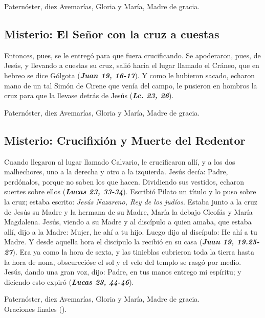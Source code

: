 \documentclass[./main.tex]{subfiles}
\newcounter{sorrowful-counter}
\begin{document}
\begin{center}
      Paternóster, diez Avemarías, Gloria y María, Madre de gracia.
\end{center}

\subsection*{ Misterio: El Señor con la cruz a cuestas}
Entonces, pues, se le entregó para que fuera crucificando. Se apoderaron, pues, de Jesús, y llevando a cuestas su cruz, salió hacia el lugar llamado el Cráneo, 
que en hebreo se dice Gólgota (\textbf{\emph{Juan 19, 16-17}}). Y como le hubieron sacado, echaron mano de un tal Simón de Cirene que venía del campo, 
le pusieron en hombros la cruz para que la llevase detrás de Jesús (\textbf{\emph{Lc. 23, 26}}).

\begin{center}
      Paternóster, diez Avemarías, Gloria y María, Madre de gracia.
\end{center}

\subsection*{ Misterio: Crucifixión y Muerte del Redentor}
Cuando llegaron al lugar llamado Calvario, le crucificaron allí, y a los dos malhechores, uno a la derecha y otro a la izquierda. Jesús decía: Padre, perdónalos, porque no saben los que hacen. 
Dividiendo sus vestidos, echaron suertes sobre ellos (\textbf{\emph{Lucas 23, 33-34}}). Escribió Pilato un título y lo puso sobre la cruz; estaba escrito: \emph{Jesús Nazareno, Rey de los judíos}. 
Estaba junto a la cruz de Jesús su Madre y la hermana de su Madre, María la debajo Cleofás y María Magdalena. Jesús, viendo a su Madre y al discípulo a quien amaba, que estaba allí, 
dijo a la Madre: Mujer, he ahí a tu hijo. Luego dijo al discípulo: He ahí a tu Madre. Y desde aquella hora el discípulo la recibió en su casa (\textbf{\emph{Juan 19, 19.25-27}}). Era ya como
la hora de sexta, y las tinieblas cubrieron toda la tierra hasta la hora de nona, obscurecióse el sol y el velo del templo se rasgó por medio. Jesús, dando una gran voz, dijo: Padre, en tus 
manos entrego mi espíritu; y diciendo esto expiró (\textbf{\emph{Lucas 23, 44-46}}).

\begin{center}
      Paternóster, diez Avemarías, Gloria y María, Madre de gracia.\\
      Oraciones finales ().
\end{center}
\end{document}
